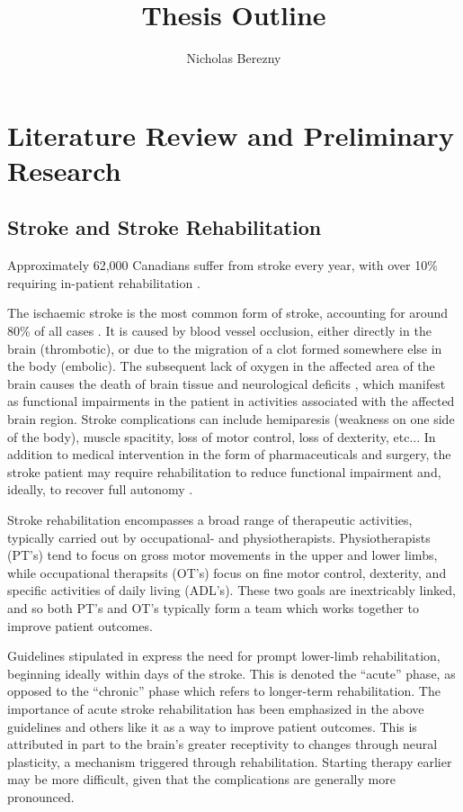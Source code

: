 \documentclass[12pt]{report}
\author{Nicholas Berezny}
\title{Thesis Outline}
\begin{document}
\maketitle
\newpage

\chapter{Literature Review and Preliminary Research}

\section{Stroke and Stroke Rehabilitation}
Approximately 62,000 Canadians suffer from stroke every year, with over 10\% requiring in-patient rehabilitation \cite{Hebert2016}. 

The ischaemic stroke is the most common form of stroke, accounting for around 80\% of all cases \cite{Rey2008}. It is caused by blood vessel occlusion, either directly in the brain (thrombotic), or due to the migration of a clot formed somewhere else in the body (embolic). The subsequent lack of oxygen in the affected area of the brain causes the death of brain tissue and neurological deficits \cite{Prabhakaran2015}, which manifest as functional impairments in the patient in activities associated with the affected brain region. Stroke complications can include hemiparesis (weakness on one side of the body), muscle spacitity, loss of motor control, loss of dexterity, etc... In addition to medical intervention in the form of pharmaceuticals and surgery, the stroke patient may require rehabilitation to reduce functional impairment and, ideally, to recover full autonomy \cite{Stroke}.

Stroke rehabilitation encompasses a broad range of therapeutic activities, typically carried out by occupational- and physiotherapists. Physiotherapists (PT's) tend to focus on gross motor movements in the upper and lower limbs, while occupational therapsits (OT's) focus on fine motor control, dexterity, and specific activities of daily living (ADL's). These two goals are inextricably linked, and so both PT's and OT's typically form a team which works together to improve patient outcomes. 

Guidelines stipulated in \cite{Hebert2016} express the need for prompt lower-limb rehabilitation, beginning ideally within days of the stroke. This is denoted the ``acute'' phase, as opposed to the ``chronic'' phase which refers to longer-term rehabilitation. The importance of acute stroke rehabilitation has been emphasized in the above guidelines and others like it as a way to improve patient outcomes. This is attributed in part to the brain's greater receptivity to changes through neural plasticity, a mechanism triggered through rehabilitation. Starting therapy earlier may be more difficult, given that the complications are generally more pronounced. 
\end{document}
